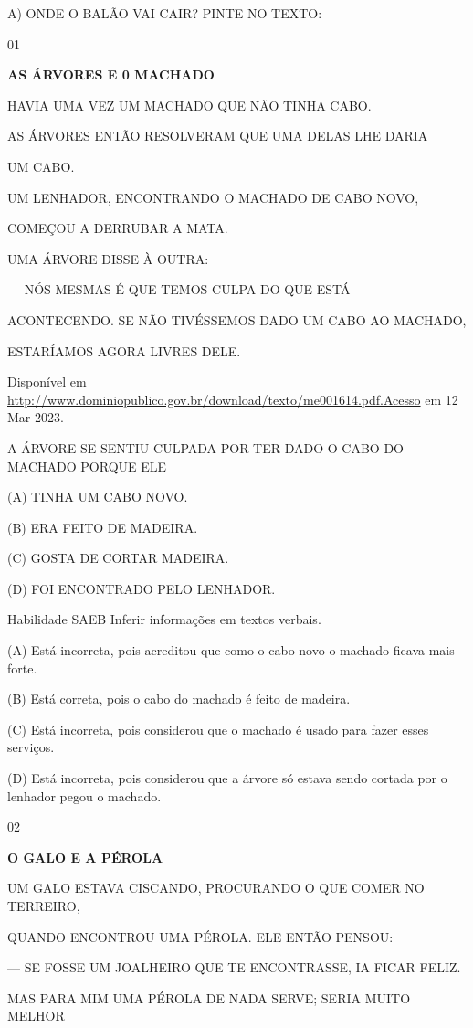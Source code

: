 {{A) ONDE O BALÃO VAI CAIR? PINTE NO TEXTO:


\num{01}

\textbf{AS ÁRVORES E 0 MACHADO}

HAVIA UMA VEZ UM MACHADO QUE NÃO TINHA CABO.

AS ÁRVORES ENTÃO RESOLVERAM QUE UMA DELAS LHE DARIA

UM CABO.

UM LENHADOR, ENCONTRANDO O MACHADO DE CABO NOVO,

COMEÇOU A DERRUBAR A MATA.

UMA ÁRVORE DISSE À OUTRA:

--- NÓS MESMAS É QUE TEMOS CULPA DO QUE ESTÁ

ACONTECENDO. SE NÃO TIVÉSSEMOS DADO UM CABO AO MACHADO,

ESTARÍAMOS AGORA LIVRES DELE.

Disponível em
\url{http://www.dominiopublico.gov.br/download/texto/me001614.pdf.Acesso}
em 12 Mar 2023.

A ÁRVORE SE SENTIU CULPADA POR TER DADO O CABO DO MACHADO PORQUE ELE

(A) TINHA UM CABO NOVO.

(B) ERA FEITO DE MADEIRA.

(C) GOSTA DE CORTAR MADEIRA.

(D) FOI ENCONTRADO PELO LENHADOR.

Habilidade SAEB Inferir informações em textos verbais.

(A) Está incorreta, pois acreditou que como o cabo novo o machado ficava
mais forte.

(B) Está correta, pois o cabo do machado é feito de madeira.

(C) Está incorreta, pois considerou que o machado é usado para fazer
esses serviços.

(D) Está incorreta, pois considerou que a árvore só estava sendo cortada
por o lenhador pegou o machado.

\num{02}

\textbf{O GALO E A PÉROLA}

UM GALO ESTAVA CISCANDO, PROCURANDO O QUE COMER NO TERREIRO,

QUANDO ENCONTROU UMA PÉROLA. ELE ENTÃO PENSOU:

--- SE FOSSE UM JOALHEIRO QUE TE ENCONTRASSE, IA FICAR FELIZ.

MAS PARA MIM UMA PÉROLA DE NADA SERVE; SERIA MUITO MELHOR

}}
